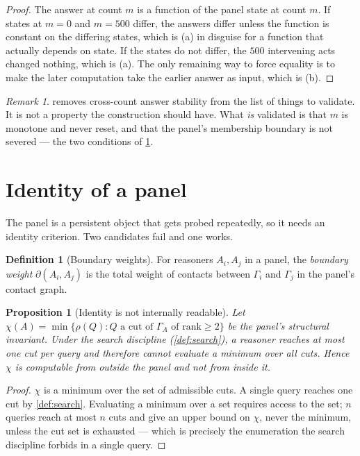 \documentclass[11pt,twocolumn,a4paper]{article}
\theoremstyle{plain}
\newtheorem{proposition}[theorem]{Proposition}
\theoremstyle{definition}
\newtheorem{definition}[theorem]{Definition}
\theoremstyle{remark}
\newtheorem{remark}[theorem]{Remark}
\begin{document}
\begin{proof}
The answer at count $m$ is a function of the panel state at count $m$. If states
at $m=0$ and $m=500$ differ, the answers differ unless the function is constant
on the differing states, which is (a) in disguise for a function that actually
depends on state. If the states do not differ, the $500$ intervening acts
changed nothing, which is (a). The only remaining way to force equality is to
make the later computation take the earlier answer as input, which is (b).
\end{proof}

\begin{remark}
 removes cross-count answer stability from the list of things
to validate. It is not a property the construction should have. What \emph{is}
validated is that $m$ is monotone and never reset, and that the panel's
membership boundary is not severed --- the two conditions of
\cref{sec:identity}.
\end{remark}

\section{Identity of a panel}
\label{sec:identity}

The panel is a persistent object that gets probed repeatedly, so it needs an
identity criterion. Two candidates fail and one works.

\begin{definition}[Boundary weights]
\label{def:boundary}
For reasoners $A_i,A_j$ in a panel, the \emph{boundary weight}
$\partial(A_i,A_j)$ is the total weight of contacts between $\Gamma_i$ and
$\Gamma_j$ in the panel's contact graph.
\end{definition}

\begin{proposition}[Identity is not internally readable]
\label{prop:external}
Let $\chi(A) = \min\{\rho(Q) : Q \text{ a cut of } \Gamma_A \text{ of rank} \ge 2\}$
be the panel's structural invariant. Under the search discipline
(\cref{def:search}), a reasoner reaches at most one cut per query and therefore
cannot evaluate a minimum over all cuts. Hence $\chi$ is computable from
outside the panel and not from inside it.
\end{proposition}

\begin{proof}
$\chi$ is a minimum over the set of admissible cuts. A single query reaches one
cut by \cref{def:search}. Evaluating a minimum over a set requires access to the
set; $n$ queries reach at most $n$ cuts and give an upper bound on $\chi$, never
the minimum, unless the cut set is exhausted --- which is precisely the
enumeration the search discipline forbids in a single query.
\end{proof}
\end{document}
